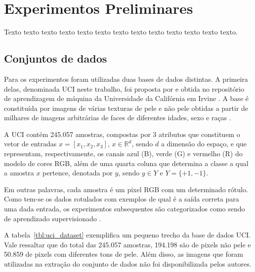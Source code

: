 \chapter{Experimentos Preliminares}
\label{cap:experimentos}

Texto texto texto texto texto texto texto texto texto texto texto texto texto.

\section{Conjuntos de dados} 
\label{sec:datasets_descricao}
Para os experimentos foram utilizadas duas bases de dados distintas. A primeira delas, denominada UCI neste trabalho, foi proposta por \citet{uci-skin-dataset:12} e obtida no repositório de aprendizagem de máquina da Universidade da Califórnia em Irvine \citep{lichman:13}. A base é constituída por imagens de várias texturas de pele e não pele obtidas a partir de milhares de imagens arbitrárias de faces de diferentes idades, sexo e raças \citep{pal-texas:04, feret:96}.

A UCI contém 245.057 amostras, compostas por 3 atributos que constituem o vetor de entradas $x = [x_1, x_2, x_3]$, $x \in \mathbb{R}^{d}$, sendo $d$ a dimensão do espaço, e que representam, respectivamente, os canais azul (B), verde (G) e vermelho (R) do modelo de cores RGB, além de uma quarta coluna que determina a classe a qual a amostra $x$ pertence, denotada por $y$, sendo $y \in Y$ e $Y = \{+1, -1\}$.

Em outras palavras, cada amostra é um pixel RGB com um determinado rótulo. Como tem-se os dados rotulados com exemplos de qual é a saída correta para uma dada entrada, os experimentos subsequentes são categorizados como sendo de aprendizado supervisionado \citep{mostafa:12}.

A tabela~\ref{tbl:uci_dataset} exemplifica um pequeno trecho da base de dados UCI. Vale ressaltar que do total das 245.057 amostras, 194.198 são de pixels não pele e 50.859 de pixels com diferentes tons de pele. Além disso, as imagens que foram utilizadas na extração do conjunto de dados não foi disponibilizada pelos autores.

